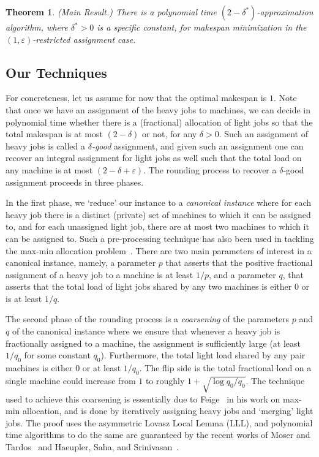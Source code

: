 \documentclass[11pt]{article}
\newtheorem{theorem}{Theorem} \newtheorem{lemma}{Lemma}[section]
\newcommand{\eps}{\varepsilon}
\renewcommand{\epsilon}{\varepsilon}
\renewcommand{\epsilon}{\varepsilon}
\begin{document}
\begin{theorem}(Main Result.)
\label{thm:main}
 There is a polynomial time $(2-\delta^*)$-approximation algorithm, where $\delta^*>0$ is a specific constant,  for makespan minimization in the $(1,\epsilon)$-restricted assignment case.
\end{theorem}

\subsection{Our Techniques}
For concreteness, let us assume for now that the optimal makespan is $1$.
Note that once we have an assignment of the heavy jobs to machines, we can decide in polynomial time whether there is a (fractional) allocation of light jobs so that the total makespan is at most $(2-\delta)$ or not, for any $\delta>0$. Such an assignment of heavy jobs is called a {\em $\delta$-good} assignment, and given such an assignment one can recover an integral assignment for light jobs as well such that the total load on any machine is at most $(2 - \delta + \eps)$. 
The rounding process to recover a $\delta$-good assignment proceeds in three phases. 

In the first phase, we `reduce' our instance to a {\em canonical instance} where for each heavy job there is a distinct (private) set of machines to which it can be assigned to, and for each unassigned light job, there are at most  two machines to which it can be assigned to. Such a  pre-processing technique has also been used in 
tackling the max-min allocation problem~\cite{BS06,CCK09}. There are two main parameters of interest in a canonical instance, namely, a parameter $p$ that asserts that the positive fractional assignment of a heavy job to a machine is at least $1/p$, and a parameter $q$, that asserts that the total load of light jobs shared by any two machines is either $0$ or is at least $1/q$.

The second phase of the rounding process is a {\em coarsening} of the parameters $p$ and $q$ of the canonical instance where we ensure that whenever a heavy job is fractionally assigned to a machine, the assignment is sufficiently large (at least $1/q_0$ for some constant $q_0$). Furthermore, the total light load shared by any pair machines is either $0$ or at least  $1/q_0$. The flip side is the total fractional load on a single machine could increase from $1$ to roughly $1 + \sqrt{\log q_0/q_0}$.
The technique used to achieve this coarsening is essentially due to Feige~\cite{Fei08} in his work on max-min allocation, and is done by iteratively assigning heavy jobs and `merging' light jobs. The proof uses the asymmetric Lovasz Local Lemma (LLL), and 
polynomial time algorithms to do the same are guaranteed by the recent works of Moser and Tardos~\cite{MT10} and Haeupler, Saha, and Srinivasan~\cite{HSS11}.
\end{document}
